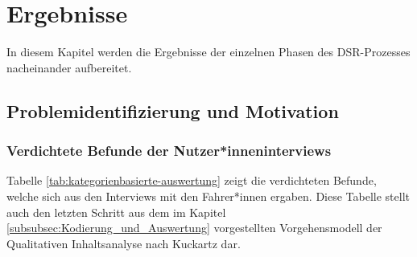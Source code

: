 
\chapter{Ergebnisse}
\label{chapter:results}

In diesem Kapitel werden die Ergebnisse der einzelnen Phasen des DSR-Prozesses \cite{peffers2007design} nacheinander aufbereitet.

\section{Problemidentifizierung und Motivation}
\label{sec:Ergebnisse_Phase_eins}

\subsection{Verdichtete Befunde der Nutzer*inneninterviews}
\label{subsec:Ergebnisse_Verdichtete_Befunde}

Tabelle \ref{tab:kategorienbasierte-auswertung} zeigt die verdichteten Befunde, welche sich aus den Interviews mit den Fahrer*innen ergaben. Diese Tabelle stellt auch den letzten Schritt aus dem im Kapitel \ref{subsubsec:Kodierung_und_Auswertung} vorgestellten Vorgehensmodell der Qualitativen Inhaltsanalyse nach Kuckartz \cite{kuckartz2014mixed} dar. 

